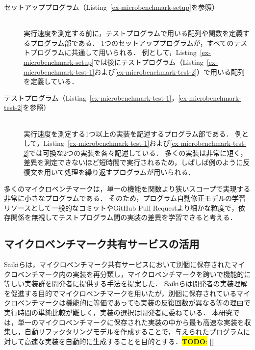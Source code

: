 \documentclass[11pt]{jreport}
\newcommand{\todo}[1]{\colorbox{yellow}{{\bf TODO}:}{\color{red} {\textbf{[#1]}}}}
\begin{document}
\begin{description}

\item[セットアッププログラム（Listing~\ref{ex-microbenchmark-setup}を参照）]\mbox{}\\
実行速度を測定する前に，テストプログラムで用いる配列や関数を定義するプログラム部である．
1つのセットアッププログラムが，すべてのテストプログラムに共通して用いられる．
例として，Listing~\ref{ex-microbenchmark-setup}では後にテストプログラム（Listing~\ref{ex-microbenchmark-test-1}および\ref{ex-microbenchmark-test-2}）で用いる配列を定義している．

\item[テストプログラム（Listing~\ref{ex-microbenchmark-test-1}，\ref{ex-microbenchmark-test-2}を参照）]\mbox{}\\
実行速度を測定する1つ以上の実装を記述するプログラム部である．
例として，Listing~\ref{ex-microbenchmark-test-1}および\ref{ex-microbenchmark-test-2}では可換な2つの実装を各々記述している．
多くの実装は非常に短く，差異を測定できないほど短時間で実行されるため，しばしば例のように反復文を用いて処理を繰り返すプログラムが用いられる．

\end{description}


多くのマイクロベンチマークは，単一の機能を関数より狭いスコープで実現する非常に小さなプログラムである．
そのため，プログラム自動修正モデルの学習リソースとして一般的なコミットやGitHub Pull Requestより細かな粒度で，依存関係を無視してテストプログラム間の実装の差異を学習できると考える．




\subsection{マイクロベンチマーク共有サービスの活用}


Saikiら\cite{Saiki_2021}は，マイクロベンチマーク共有サービスにおいて別個に保存されたマイクロベンチマーク内の実装を再分類し，マイクロベンチマークを跨いで機能的に等しい実装群を開発者に提供する手法を提案した．
Saikiらは開発者の実装理解を促進する目的でマイクロベンチマークを用いたが，別個に保存されているマイクロベンチマークは機能的に等価であっても実装の反復回数が異なる等の理由で実行時間の単純比較が難しく，実装の選択は開発者に委ねている．
本研究では，単一のマイクロベンチマークに保存された実装の中から最も高速な実装を収集し，自動リファクタリングモデルを作成することで，与えられたプログラムに対して高速な実装を自動的に生成することを目的とする．\todo{}
\end{document}
